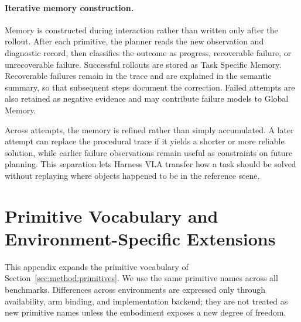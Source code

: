 \documentclass{article}
\begin{document}
  \paragraph{Iterative memory construction.}
  Memory is constructed during interaction rather than written only after the rollout.
  After each primitive, the planner reads the new observation and diagnostic record, then
  classifies the outcome as progress, recoverable failure, or unrecoverable failure.
  Successful rollouts are stored as Task Specific Memory. Recoverable failures remain in
  the trace and are explained in the semantic summary, so that subsequent steps document
  the correction. Failed attempts are also retained as negative evidence and may
  contribute failure models to Global Memory.

  Across attempts, the memory is refined rather than simply accumulated. A later attempt
  can replace the procedural trace if it yields a shorter or more reliable solution,
  while earlier failure observations remain useful as constraints on future planning.
  This separation lets Harness VLA transfer how a task should be solved without replaying
  where objects happened to be in the reference scene.


\section{Primitive Vocabulary and Environment-Specific Extensions}
\label{app:primitives}

This appendix expands the primitive vocabulary of Section~\ref{sec:method:primitives}. We use the same primitive names across all benchmarks. Differences across environments are expressed only through availability, arm binding, and implementation backend; they are not treated as new primitive names unless the embodiment exposes a new degree of freedom.
\end{document}
